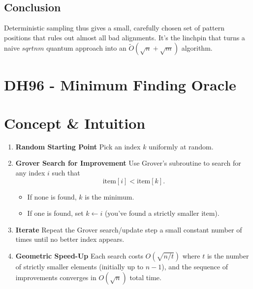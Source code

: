 \documentclass[11pt]{article}
\begin{document}
\subsection*{Conclusion}
Deterministic sampling thus gives a small, carefully chosen set of pattern positions that rules out almost all bad alignments. It's the linchpin that turns a naive \(sqrt{nm}\) quantum approach into an \(\widetilde{O}(\sqrt{n} + \sqrt{m})\) algorithm.

\section*{DH96 - Minimum Finding Oracle}
\section*{Concept \& Intuition}
\begin{enumerate}
    \item \textbf{Random Starting Point}
          Pick an index \(k\) uniformly at random.
    \item \textbf{Grover Search for Improvement}
          Use Grover's subroutine to search for any index \(i\) such that
          \[
              \text{item}[i] < \text{item}[k].
          \]
          \begin{itemize}
              \item If none is found, \(k\) is the minimum.
              \item If one is found, set \(k \leftarrow i\) (you've found a strictly smaller item).
          \end{itemize}
    \item \textbf{Iterate}
          Repeat the Grover search/update step a small constant number of times until no better index appears.
    \item \textbf{Geometric Speed-Up}
          Each search costs \(O(\sqrt{n/t})\) where \(t\) is the number of strictly smaller elements (initially up to \(n-1\)), and the sequence of improvements converges in \(O(\sqrt{n})\) total time.
\end{enumerate}
\end{document}
